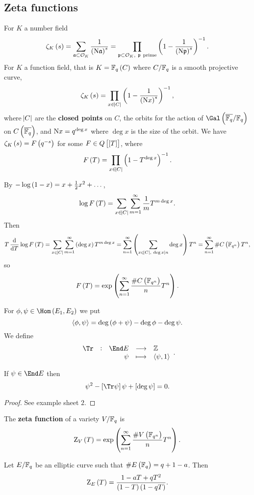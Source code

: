 \subsection{Zeta functions}

For $ K $ a number field
$$ \zeta_K\br{s} = \sum_{\aaa \subset \OOO_K} \dfrac{1}{\br{\N\aaa}^s} = \prod_{\ppp \subset \OOO_K, \ \ppp \ \text{prime}} \br{1 - \dfrac{1}{\br{\N\ppp}^s}}^{-1}. $$
For $ K $ a function field, that is $ K = \FF_q\br{C} $ where $ C / \mathbb{F}_q $ is a smooth projective curve,
$$ \zeta_K\br{s} = \prod_{x \in \abs{C}} \br{1 - \dfrac{1}{\br{\N x}^s}}^{-1}, $$
where $ \abs{C} $ are the \textbf{closed points} on $ C $, the orbits for the action of $ \Gal\br{\overline{\FF_q} / \FF_q} $ on $ C\br{\overline{\FF_q}} $, and $ \mathrm{N} x = q^{\deg x} $ where $ \deg x $ is the size of the orbit. We have $ \zeta_K\br{s} = F\br{q^{-s}} $ for some $ F \in Q\sbr{\sbr{T}} $, where
$$ F\br{T} = \prod_{x \in \abs{C}} \br{1 - T^{\deg x}}^{-1}. $$

\pagebreak

By $ -\log \br{1 - x} = x + \tfrac{1}{2}x^2 + \dots $,
$$ \log F\br{T} = \sum_{x \in \abs{C}} \sum_{m = 1}^\infty \dfrac{1}{m}T^{m\deg x}. $$
Then
$$ T\dod{}{T}\log F\br{T} = \sum_{x \in \abs{C}} \sum_{m = 1}^\infty \br{\deg x}T^{m\deg x} = \sum_{n = 1}^\infty \br{\sum_{x \in \abs{C}, \ \deg x \mid n} \deg x}T^n = \sum_{n = 1}^\infty \#C\br{\FF_{q^n}}T^n, $$
so
$$ F\br{T} = \exp \br{\sum_{n = 1}^\infty \dfrac{\#C\br{\FF_{q^n}}}{n}T^n}. $$


For $ \phi, \psi \in \Hom\br{E_1, E_2} $ we put
$$ \abr{\phi, \psi} = \deg \br{\phi + \psi} - \deg \phi - \deg \psi. $$
We define
$$ \function[\Tr]{\End E}{\ZZ}{\psi}{\abr{\psi, 1}}. $$

\begin{lemma}
\label{lem:7.3}
If $ \psi \in \End E $ then
$$ \psi^2 - \sbr{\Tr \psi}\psi + \sbr{\deg \psi} = 0. $$
\end{lemma}

\begin{proof}
See example sheet $ 2 $.
\end{proof}

\begin{definition*}
The \textbf{zeta function} of a variety $ V / \mathbb{F}_q $ is
$$ \Z_V\br{T} = \exp \br{\sum_{n = 1}^\infty \dfrac{\#V\br{\FF_{q^n}}}{n}T^n}. $$
\end{definition*}

\begin{lemma}
Let $ E / \mathbb{F}_q $ be an elliptic curve such that $ \#E\br{\FF_q} = q + 1 - a $. Then
$$ \Z_E\br{T} = \dfrac{1 - aT + qT^2}{\br{1 - T}\br{1 - qT}}. $$
\end{lemma}


